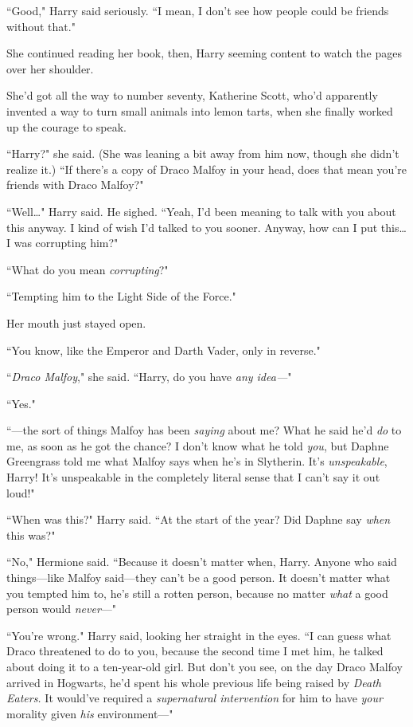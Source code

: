 ``Good," Harry said seriously. ``I mean, I don't see how people could be friends without that."

She continued reading her book, then, Harry seeming content to watch the pages over her shoulder.

She'd got all the way to number seventy, Katherine Scott, who'd apparently invented a way to turn small animals into lemon tarts, when she finally worked up the courage to speak.

``Harry?" she said. (She was leaning a bit away from him now, though she didn't realize it.) ``If there's a copy of Draco Malfoy in your head, does that mean you're friends with Draco Malfoy?"

``Well…" Harry said. He sighed. ``Yeah, I'd been meaning to talk with you about this anyway. I kind of wish I'd talked to you sooner. Anyway, how can I put this…I was corrupting him?"

``What do you mean \emph{corrupting}?"

``Tempting him to the Light Side of the Force."

Her mouth just stayed open.

``You know, like the Emperor and Darth Vader, only in reverse."

``\emph{Draco Malfoy}," she said. ``Harry, do you have \emph{any idea—}"

``Yes."

``—the sort of things Malfoy has been \emph{saying} about me? What he said he'd \emph{do} to me, as soon as he got the chance? I don't know what he told \emph{you}, but Daphne Greengrass told me what Malfoy says when he's in Slytherin. It's \emph{unspeakable}, Harry! It's unspeakable in the completely literal sense that I can't say it out loud!"

``When was this?" Harry said. ``At the start of the year? Did Daphne say \emph{when} this was?"

``No," Hermione said. ``Because it doesn't matter when, Harry. Anyone who said things—like Malfoy said—they can't be a good person. It doesn't matter what you tempted him to, he's still a rotten person, because no matter \emph{what} a good person would \emph{never}—"

``You're wrong." Harry said, looking her straight in the eyes. ``I can guess what Draco threatened to do to you, because the second time I met him, he talked about doing it to a ten-year-old girl. But don't you see, on the day Draco Malfoy arrived in Hogwarts, he'd spent his whole previous life being raised by \emph{Death Eaters.} It would've required a \emph{supernatural intervention} for him to have \emph{your} morality given \emph{his} environment—"

